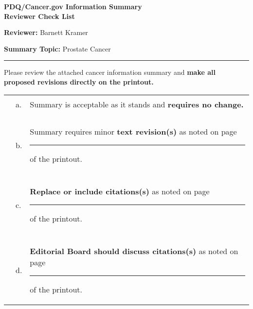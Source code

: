 \documentclass[letterpaper,12pt]{letter}
\begin{document}
\thispagestyle{empty}

\begin{center}
 \textbf{PDQ\textregistered/Cancer.gov Information Summary \\
         Reviewer Check List}
\end{center}

\vspace{24pt}

\textbf{Reviewer: } Barnett Kramer

\vspace{12pt}

\textbf{Summary Topic: } Prostate Cancer

\rule{6.5in}{.02in}

\vspace{12pt}

Please review the attached cancer information summary and \textbf{make
all proposed revisions directly on the printout.}

\vspace{12pt}

\begin{tabular}{llp{4.5in}}
\hspace{.25in}\rule{1in}{.01in} & a. & Summary is acceptable as it stands 
                                      and \textbf{requires no change.} \\
\\
\hspace{.25in}\rule{1in}{.01in} & b. & Summary requires minor \textbf{text
                                      revision(s)} as noted on page
                                      \rule{.5in}{.01in} of the printout. \\
\\
\hspace{.25in}\rule{1in}{.01in} & c. & \textbf{Replace or include citations(s)}
                                      as noted on page \rule{.5in}{.01in}
                                      of the printout. \\
\\
\hspace{.25in}\rule{1in}{.01in} & d. & \textbf{Editorial Board should discuss
                                      citations(s)} as noted on page
                                      \rule{.5in}{.01in} of the printout.
\end{tabular}
\end{document}
